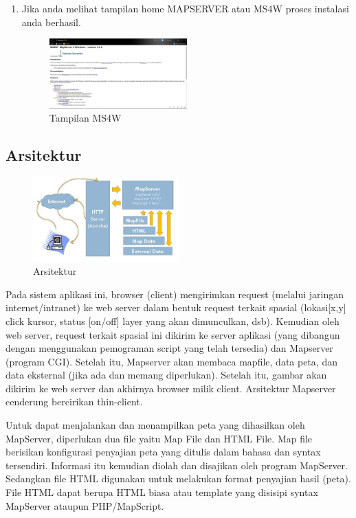 \begin{enumerate}
\item
Jika anda melihat tampilan home MAPSERVER atau MS4W proses instalasi anda berhasil.
\begin{figure}[ht]
	    \centerline{\includegraphics[width=0.50\textwidth]{figures/gambar4.JPG}}
	    \caption{Tampilan MS4W}
		\label{gambar4}
		\end{figure}
\end{enumerate}


\subsection{Arsitektur}
\begin{figure}[ht]
	    \centerline{\includegraphics[width=0.50\textwidth]{figures/gambar6.JPG}}
	    \caption{Arsitektur}
		\label{gambar6}
		\end{figure}
Pada sistem aplikasi ini, browser (client) mengirimkan request (melalui jaringan internet/intranet) ke web server dalam bentuk request terkait spasial (lokasi[x,y] click kursor, status [on/off] layer yang akan dimunculkan, dsb).
Kemudian oleh web server, request terkait spasial ini dikirim ke server aplikasi (yang dibangun dengan menggunakan pemograman script yang telah tersedia) dan Mapserver (program CGI). Setelah itu, Mapserver akan membaca mapfile, data peta, dan data eksternal (jika ada dan memang diperlukan).
Setelah itu, gambar akan dikirim ke web server dan akhirnya browser milik client. Arsitektur Mapserver cenderung bercirikan thin-client.

Untuk dapat menjalankan dan menampilkan peta yang dihasilkan oleh MapServer, diperlukan dua file yaitu Map File dan HTML File. Map file berisikan konfigurasi penyajian peta yang ditulis dalam bahasa dan syntax tersendiri. Informasi itu kemudian diolah dan disajikan oleh program MapServer. 
Sedangkan file HTML digunakan untuk melakukan format penyajian hasil (peta). File HTML dapat berupa HTML biasa atau template yang disisipi syntax MapServer ataupun PHP/MapScript.


